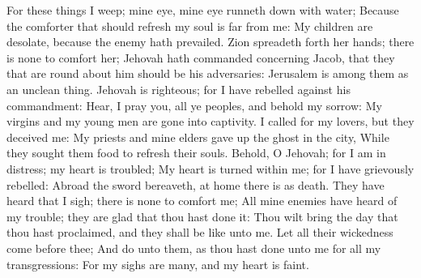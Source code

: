For these things I weep; mine eye, mine eye runneth down with water; Because the comforter that should refresh my soul is far from me: My children are desolate, because the enemy hath prevailed.  Zion spreadeth forth her hands; there is none to comfort her; Jehovah hath commanded concerning Jacob, that they that are round about him should be his adversaries: Jerusalem is among them as an unclean thing.  Jehovah is righteous; for I have rebelled against his commandment: Hear, I pray you, all ye peoples, and behold my sorrow: My virgins and my young men are gone into captivity.  I called for my lovers, but they deceived me: My priests and mine elders gave up the ghost in the city, While they sought them food to refresh their souls.  Behold, O Jehovah; for I am in distress; my heart is troubled; My heart is turned within me; for I have grievously rebelled: Abroad the sword bereaveth, at home there is as death.  They have heard that I sigh; there is none to comfort me; All mine enemies have heard of my trouble; they are glad that thou hast done it: Thou wilt bring the day that thou hast proclaimed, and they shall be like unto me.  Let all their wickedness come before thee; And do unto them, as thou hast done unto me for all my transgressions: For my sighs are many, and my heart is faint. 

